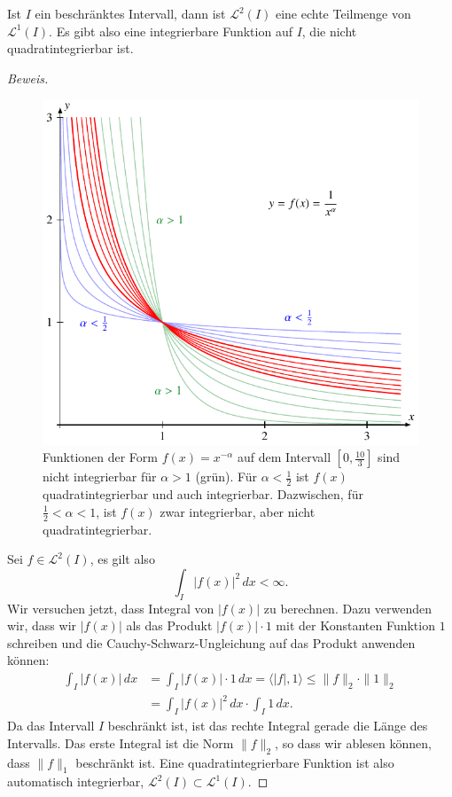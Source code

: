 \begin{lemma}
\label{fourier:l1l2}
Ist $I$ ein beschränktes Intervall, dann ist $\mathcal{L}^2(I)$ eine
echte Teilmenge von $\mathcal{L}^1(I)$.
Es gibt also eine integrierbare Funktion auf $I$, die nicht
quadratintegrierbar ist.
\end{lemma}

\begin{proof}[Beweis]
\begin{figure}
\centering
\includegraphics{chapters/2-fourier/images/intfun.pdf}
\caption{Funktionen der Form $f(x)=x^{-\alpha}$ auf dem Intervall
$[0,\frac{10}{3}]$ sind nicht integrierbar für $\alpha > 1$ (grün).
Für $\alpha <\frac12$ ist $f(x)$ quadratintegrierbar und auch integrierbar.
Dazwischen, für $\frac12 <\alpha < 1$, ist $f(x)$ zwar integrierbar, aber
nicht quadratintegrierbar.
\label{fourier:intfun}}
\end{figure}
Sei $f\in\mathcal{L}^2(I)$, es gilt also
\[
\int_I |f(x)|^2\,dx < \infty.
\]
Wir versuchen jetzt, dass Integral von $|f(x)|$ zu berechnen.
Dazu verwenden wir, dass wir $|f(x)|$ als das Produkt
$|f(x)|\cdot 1$ mit der Konstanten Funktion $1$ schreiben
und die Cauchy-Schwarz-Ungleichung auf das Produkt anwenden können:
\begin{align*}
\int_I |f(x)|\,dx
&=
\int_I |f(x)| \cdot 1 \,dx
=
\langle |f|, 1\rangle
\le
\|f\|_2 \cdot \| 1 \|_2
\\
&=
\int_I |f(x)|^2\,dx \cdot \int_I 1\,dx.
\end{align*}
Da das Intervall $I$ beschränkt ist, ist das rechte Integral gerade die
Länge des Intervalls.
Das erste Integral ist die Norm $\|f\|_2$, so dass wir ablesen können,
dass $\|f\|_1$ beschränkt ist.
Eine quadratintegrierbare Funktion ist also automatisch integrierbar,
$\mathcal{L}^2(I)\subset \mathcal{L}^1(I)$.


\end{proof}
